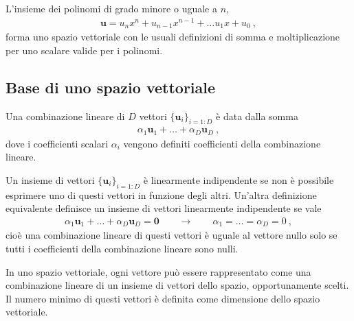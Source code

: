 \documentclass[letterpaper,10pt,english]{jupyterBook}
\begin{document}
\sphinxAtStartPar
{}

\sphinxAtStartPar
{} L’insieme dei polinomi di grado minore o uguale a \(n\),
\begin{equation*}
\begin{split}\mathbf{u} = u_n x^n + u_{n-1} x^{n-1} + \dots u_1 x + u_0 \ ,\end{split}
\end{equation*}
\sphinxAtStartPar
forma uno spazio vettoriale con le usuali definizioni di somma e moltiplicazione per uno scalare valide per i polinomi.


\subsection{Base di uno spazio vettoriale}
\label{\detokenize{ch/algebra/vector-algebra-def:base-di-uno-spazio-vettoriale}}
\sphinxAtStartPar
{} Una combinazione lineare di \(D\) vettori \(\{ \mathbf{u}_i \}_{i=1:D}\) è data dalla somma
\begin{equation*}
\begin{split}\alpha_1 \mathbf{u}_1 + \dots + \alpha_D \mathbf{u}_D \ ,\end{split}
\end{equation*}
\sphinxAtStartPar
dove i coefficienti scalari \(\alpha_i\) vengono definiti coefficienti della combinazione lineare.

\sphinxAtStartPar
{} Un insieme di vettori \(\{ \mathbf{u}_i \}_{i=1:D}\) è linearmente indipendente se non è possibile esprimere uno di questi vettori in funzione degli altri. Un’altra definizione equivalente definisce un insieme di vettori linearmente indipendente se vale
\begin{equation*}
\begin{split}\alpha_1 \mathbf{u}_1 + \dots + \alpha_D \mathbf{u}_D = \mathbf{0} \qquad \rightarrow \qquad \alpha_1 = \dots = \alpha_D = 0 \ ,\end{split}
\end{equation*}
\sphinxAtStartPar
cioè una combinazione lineare di questi vettori è uguale al vettore nullo solo se tutti i coefficienti della combinazione lineare sono nulli.

\sphinxAtStartPar
{} In uno spazio vettoriale, ogni vettore può essere rappresentato come una combinazione lineare di un insieme di vettori dello spazio, opportunamente scelti. Il numero minimo di questi vettori è definita come dimensione dello spazio vettoriale.
\end{document}
